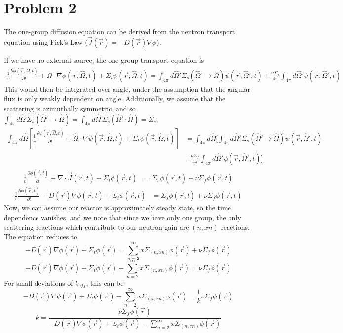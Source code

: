 \documentclass{article}
\newcommand{\p}{\partial}
\newcommand{\Xs}{\Sigma}
\newcommand{\Oov}{\frac{1}{v}}
\newcommand{\pos}{\vec{r}}
\newcommand{\cur}{\vec{J}}
\newcommand{\Oh}{\hat{\Omega}}
\newcommand{\intfp}{\int_{4\pi}}
\newcommand{\rt}{(\pos,t)}
\newcommand{\rOt}{(\pos,\Oh,t)}
\newcommand{\rOtprime}{(\pos,\Oh',t)}
\begin{document}

\section*{Problem 2}

The one-group diffusion equation can be derived from the neutron transport equation using Fick's Law ($\cur(\pos) = -D(\pos)\nabla \phi$). 

If we have no external source, the one-group transport equation is 
\begin{align*}
\Oov \frac{\p \phi\rOt}{\p t} + \Omega \cdot \nabla \phi \rOt + \Xs_t \psi\rOt = \intfp d\Oh' \Xs_s(\Oh' \rightarrow \Oh) \psi\rOtprime + \frac{\nu\Xs_f}{4\pi} \intfp d\Oh' \psi\rOtprime
\end{align*}
This would then be integrated over angle, under the assumption that the angular flux is only weakly dependent on angle. Additionally, we assume that the scattering is azimuthally symmetric, and so $\intfp d\Oh \, \Xs_s(\Oh' \rightarrow \Oh) = \intfp d\Oh \, \Xs_s(\Oh' \cdot \Oh) = \Xs_s$.
\begin{align*}
\intfp d\Oh \left[ \Oov \frac{\p \psi\rOt}{\p t} + \Oh \cdot \nabla \psi \rOt + \Xs_t \psi\rOt \right] &= \intfp d\Oh \bigg[ \intfp d\Oh' \Xs_s(\Oh' \rightarrow \Oh) \psi\rOtprime \\
&+ \frac{\nu\Xs_f}{4\pi} \intfp d\Oh' \psi\rOtprime \bigg]
\end{align*}
\begin{align*}
\Oov \frac{\p \phi\rt}{\p t} + \nabla \cdot \cur\rt + \Xs_t \phi\rt &=\Xs_s \phi\rt + \nu\Xs_f \phi\rt
\end{align*}
\begin{align*}
\Oov \frac{\p \phi\rt}{\p t} -D(\pos)\nabla \phi\rt + \Xs_t \phi\rt &=\Xs_s \phi\rt + \nu\Xs_f \phi\rt
\end{align*}
Now, we can assume our reactor is approximately steady state, so the time dependence vanishes, and we note that since we have only one group, the only scattering reactions which contribute to our neutron gain are $(n,xn)$ reactions. The equation reduces to
$$ -D(\pos)\nabla \phi(\pos) + \Xs_t \phi(\pos) =\sum_{n=2}^{\infty}x \Xs_{(n,xn)} \phi(\pos) + \nu\Xs_f \phi(\pos) $$
$$ -D(\pos)\nabla \phi(\pos) + \Xs_t \phi(\pos) - \sum_{n=2}^{\infty}x \Xs_{(n,xn)} \phi(\pos) = \nu\Xs_f \phi(\pos) $$
For small deviations of $k_{\textit{eff}}$, this can be
$$ -D(\pos)\nabla \phi(\pos) + \Xs_t \phi(\pos) - \sum_{n=2}^{\infty}x \Xs_{(n,xn)} \phi(\pos) = \frac{1}{k}\nu\Xs_f \phi(\pos) $$
$$\boxed{ k = \frac{\nu\Xs_f \phi(\pos)}{-D(\pos)\nabla \phi(\pos) + \Xs_t \phi(\pos) - \sum_{n=2}^{\infty}x \Xs_{(n,xn)} \phi(\pos)} }$$
\end{document}
